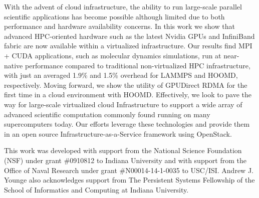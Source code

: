 \documentclass[10pt]{sigplanconf}
\begin{document}
With the advent of cloud infrastructure, the ability to run large-scale parallel scientific applications has become possible although limited due to both performance and hardware availability concerns. In this work we show that advanced HPC-oriented hardware such as the latest Nvidia GPUs and InfiniBand fabric are now available within a virtualized infrastructure. Our results find MPI + CUDA applications, such as molecular dynamics simulations, run at near-native performance compared to traditional non-virtualized HPC infrastructure, with just an averaged 1.9\% and 1.5\% overhead for LAMMPS and HOOMD, respectively. Moving forward, we show the utility of GPUDirect RDMA for the first time in a cloud environment with HOOMD.  Effectively, we look to pave the way for large-scale virtualized cloud Infrastructure to support a wide array of advanced scientific computation commonly found running on many supercomputers today.  Our efforts leverage these technologies and provide them in an open source Infrastructure-as-a-Service framework using OpenStack.  







\acks

This work was developed with support from the National Science Foundation (NSF)
under grant \#0910812 to Indiana University and with support from the Office
of Naval Research under grant \#N00014-14-1-0035 to USC/ISI.  Andrew J. Younge also
acknowledges support from The Persistent Systems Fellowship of the School of
Informatics and Computing at Indiana University.


%



\end{document}
